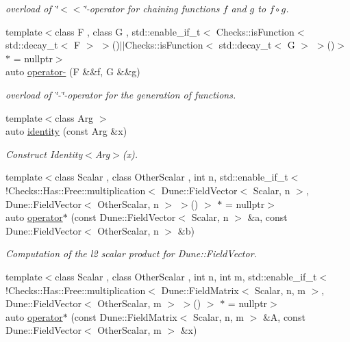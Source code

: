 \begin{DoxyCompactItemize}
\begin{DoxyCompactList}\small\item\em overload of \char`\"{}$<$$<$\char`\"{}-\/operator for chaining functions $f$ and $g$ to $ f \circ g $. \end{DoxyCompactList}\item 
{\footnotesize template$<$class F , class G , std\-::enable\-\_\-if\-\_\-t$<$ Checks\-::is\-Function$<$ std\-::decay\-\_\-t$<$ F $>$ $>$()$|$$|$\-Checks\-::is\-Function$<$ std\-::decay\-\_\-t$<$ G $>$ $>$()$>$ $\ast$  = nullptr$>$ }\\auto \hyperlink{namespaceFunG_a3af04c2ef5c1b206feb75fffd298cbbf}{operator-\/} (\-F \&\&f, \-G \&\&g)
\begin{DoxyCompactList}\small\item\em overload of \char`\"{}-\/\char`\"{}-\/operator for the generation of functions. \end{DoxyCompactList}\item 
{\footnotesize template$<$class Arg $>$ }\\auto \hyperlink{namespaceFunG_a165e879e76d3a2a8906938f3658445ce}{identity} (const \-Arg \&x)
\begin{DoxyCompactList}\small\item\em \-Construct \-Identity$<$\-Arg$>$(x). \end{DoxyCompactList}\item 
{\footnotesize template$<$class Scalar , class Other\-Scalar , int n, std\-::enable\-\_\-if\-\_\-t$<$ !\-Checks\-::\-Has\-::\-Free\-::multiplication$<$ Dune\-::\-Field\-Vector$<$ Scalar, n $>$, Dune\-::\-Field\-Vector$<$ Other\-Scalar, n $>$ $>$() $>$ $\ast$  = nullptr$>$ }\\auto \hyperlink{namespaceFunG_a5e258023361844926f485229c62a733b}{operator$\ast$} (const \-Dune\-::\-Field\-Vector$<$ \-Scalar, n $>$ \&a, const \-Dune\-::\-Field\-Vector$<$ \-Other\-Scalar, n $>$ \&b)
\begin{DoxyCompactList}\small\item\em \-Computation of the l2 scalar product for \-Dune\-::\-Field\-Vector. \end{DoxyCompactList}\item 
{\footnotesize template$<$class Scalar , class Other\-Scalar , int n, int m, std\-::enable\-\_\-if\-\_\-t$<$ !\-Checks\-::\-Has\-::\-Free\-::multiplication$<$ Dune\-::\-Field\-Matrix$<$ Scalar, n, m $>$, Dune\-::\-Field\-Vector$<$ Other\-Scalar, m $>$ $>$() $>$ $\ast$  = nullptr$>$ }\\auto \hyperlink{namespaceFunG_abadb8da34a5abc3dde0107231ab91c6f}{operator$\ast$} (const \-Dune\-::\-Field\-Matrix$<$ \-Scalar, n, m $>$ \&\-A, const \-Dune\-::\-Field\-Vector$<$ \-Other\-Scalar, m $>$ \&x)

\end{DoxyCompactItemize}
